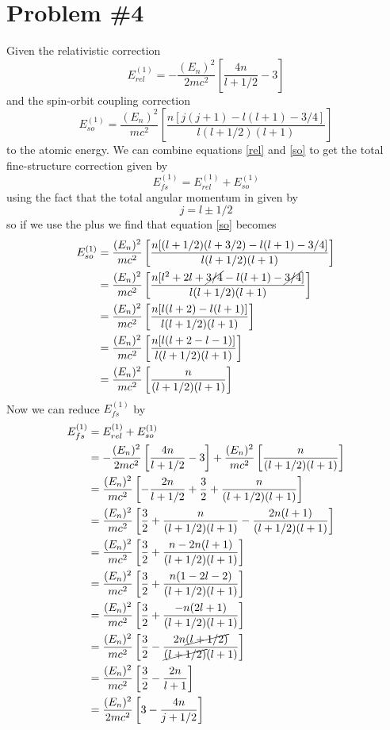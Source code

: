 \documentclass[11pt]{article}
\numberwithin{equation}{section}
\begin{document}
\section{Problem \#4}
Given the relativistic correction 
\begin{equation}
E^{(1)}_{rel} = -\frac{(E_n)^2}{2mc^2}\left[\frac{4n}{l+1/2}-3\right]
\label{rel}
\end{equation}
and the spin-orbit coupling correction
\begin{equation}
E^{(1)}_{so} = \frac{(E_n)^2}{mc^2}\left[\frac{n[j(j+1)-l(l+1)-3/4]}{l(l+1/2)(l+1)}\right]
\label{so}
\end{equation}
to the atomic energy. We can combine equations \ref{rel} and \ref{so} to get the total fine-structure correction given by
$$E_{fs}^{(1)} = E_{rel}^{(1)} + E_{so}^{(1)}$$
using the fact that the total angular momentum in given by
$$j=l\pm1/2$$
so if we use the plus we find that equation \ref{so} becomes
\begin{align*}
E^{(1)}_{so} &= \frac{(E_n)^2}{mc^2}\left[\frac{n[(l+1/2)(l+3/2)-l(l+1)-3/4]}{l(l+1/2)(l+1)}\right]\\
&= \frac{(E_n)^2}{mc^2}\left[\frac{n[l^2+2l+\cancel{3/4}-l(l+1)-\cancel{3/4}]}{l(l+1/2)(l+1)}\right]\\
&= \frac{(E_n)^2}{mc^2}\left[\frac{n[l(l+2)-l(l+1)]}{l(l+1/2)(l+1)}\right]\\
&= \frac{(E_n)^2}{mc^2}\left[\frac{n[l(l+2-l-1)]}{l(l+1/2)(l+1)}\right]\\
&= \frac{(E_n)^2}{mc^2}\left[\frac{n}{(l+1/2)(l+1)}\right]
\end{align*}
Now we can reduce $E_{fs}^{(1)}$ by
\begin{align*}
E_{fs}^{(1)} &= E_{rel}^{(1)} + E_{so}^{(1)}\\
&= -\frac{(E_n)^2}{2mc^2}\left[\frac{4n}{l+1/2}-3\right] + \frac{(E_n)^2}{mc^2}\left[\frac{n}{(l+1/2)(l+1)}\right]\\
&= \frac{(E_n)^2}{mc^2}\left[-\frac{2n}{l+1/2} + \frac{3}{2} + \frac{n}{(l+1/2)(l+1)}\right]\\
&= \frac{(E_n)^2}{mc^2}\left[\frac{3}{2} + \frac{n}{(l+1/2)(l+1)} - \frac{2n(l+1)}{(l+1/2)(l+1)}\right]\\
&= \frac{(E_n)^2}{mc^2}\left[\frac{3}{2} + \frac{n - 2n(l+1)}{(l+1/2)(l+1)}\right]\\
&= \frac{(E_n)^2}{mc^2}\left[\frac{3}{2} + \frac{n(1 - 2l - 2)}{(l+1/2)(l+1)}\right]\\
&= \frac{(E_n)^2}{mc^2}\left[\frac{3}{2} + \frac{-n(2l+1)}{(l+1/2)(l+1)}\right]\\
&= \frac{(E_n)^2}{mc^2}\left[\frac{3}{2} - \frac{2n\cancel{(l+1/2)}}{\cancel{(l+1/2)}(l+1)}\right]\\
&= \frac{(E_n)^2}{mc^2}\left[\frac{3}{2} - \frac{2n}{l+1}\right]\\
&= \frac{(E_n)^2}{2mc^2}\left[3 - \frac{4n}{j+1/2}\right]
\end{align*}
\end{document}
